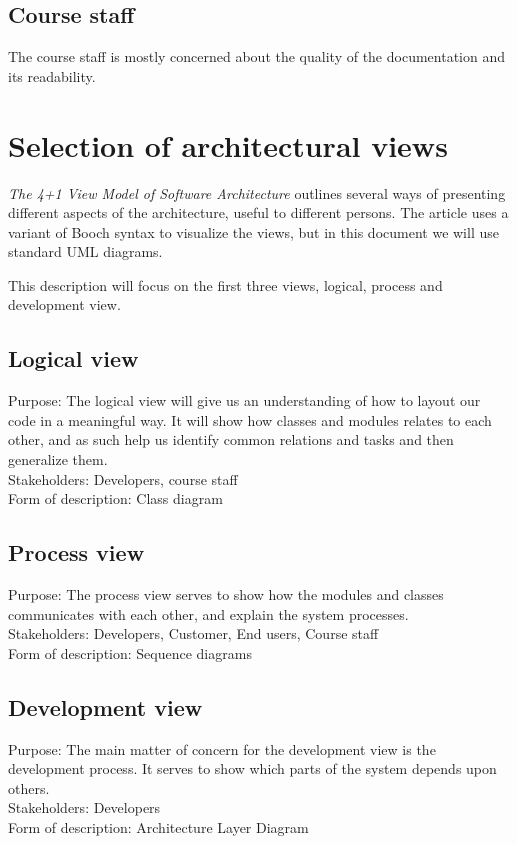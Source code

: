 \documentclass[11pt]{book}
\begin{document}
\subsection{Course staff}
The course staff is mostly concerned about the quality of the documentation and its readability.

\section{Selection of architectural views}
\emph{The 4+1 View Model of Software Architecture} \cite{Kruchten:1995:VMA:624610.625529} outlines several ways of presenting different aspects of the architecture, useful to different persons. The article uses a variant of Booch syntax to visualize the views, but in this document we will use standard UML diagrams.

This description will focus on the first three views, logical, process and development view.

\subsection{Logical view}\label{subsec:logicalViewDescription}
Purpose: The logical view will give us an understanding of how to layout our code in a meaningful way. It will show how classes and modules relates to each other, and as such help us identify common relations and tasks and then generalize them.\\
Stakeholders: Developers, course staff\\
Form of description: Class diagram

\subsection{Process view}\label{subsec:processViewDescription}
Purpose: The process view serves to show how the modules and classes communicates with each other, and explain the system processes.\\
Stakeholders: Developers, Customer, End users, Course staff\\
Form of description: Sequence diagrams

\subsection{Development view}\label{subsec:developmentViewDescription}
Purpose: The main matter of concern for the development view is the development process. It serves to show which parts of the system depends upon others. \\
Stakeholders: Developers\\
Form of description: Architecture Layer Diagram
\end{document}
